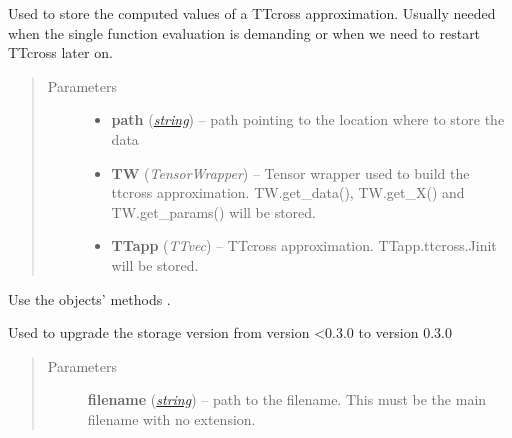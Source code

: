 \documentclass[a4paper,10pt,english]{sphinxmanual}
\begin{document}
\begin{fulllineitems}
\label{api-core:TensorToolbox.core.ttcross_store}
Used to store the computed values of a TTcross approximation. Usually needed when the single function evaluation is demanding or when we need to restart TTcross later on.
\begin{quote}\begin{description}
\item[{Parameters}] \leavevmode\begin{itemize}
\item {} 
\textbf{path} (\href{http://docs.python.org/library/string.html\#module-string}{\emph{string}}) -- path pointing to the location where to store the data

\item {} 
\textbf{TW} (\emph{TensorWrapper}) -- Tensor wrapper used to build the ttcross approximation. TW.get\_data(), TW.get\_X() and TW.get\_params() will be stored.

\item {} 
\textbf{TTapp} (\emph{TTvec}) -- TTcross approximation. TTapp.ttcross.Jinit will be stored.

\end{itemize}

\end{description}\end{quote}

Use the objects' methods .

\end{fulllineitems}


\begin{fulllineitems}
\label{api-core:TensorToolbox.core.to_v_0_3_0}
Used to upgrade the storage version from version \textless{}0.3.0 to version 0.3.0
\begin{quote}\begin{description}
\item[{Parameters}] \leavevmode
\textbf{filename} (\href{http://docs.python.org/library/string.html\#module-string}{\emph{string}}) -- path to the filename. This must be the main filename with no extension.

\end{description}\end{quote}

\end{fulllineitems}
\end{document}
